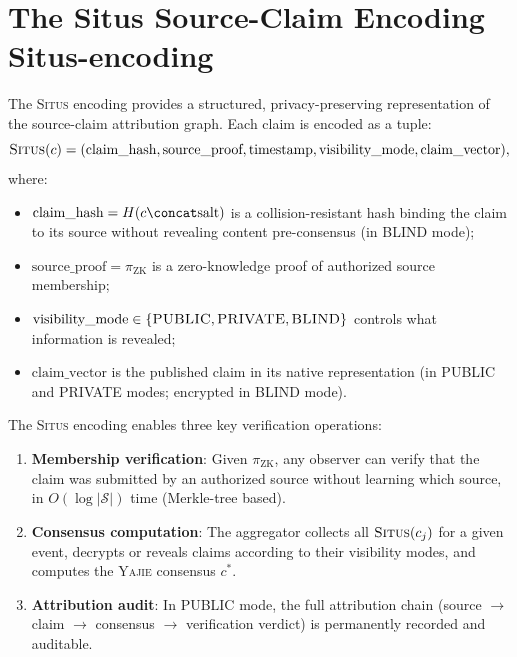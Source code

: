 \documentclass[11pt,a4paper]{article}
\theoremstyle{definition}
\newcommand{\Situs}{\textsc{Situs}}
\newcommand{\Yajie}{\textsc{Yajie}}
\newcommand{\sourceSet}{\mathcal{S}}
\newcommand{\VISpublic}{\textsc{PUBLIC}}
\newcommand{\VISprivate}{\textsc{PRIVATE}}
\newcommand{\VISblind}{\textsc{BLIND}}
\begin{document}
\section{The Situs Source-Claim Encoding Situs-encoding}
\label{sec:situs}

The \Situs{} encoding provides a structured, privacy-preserving representation of the source-claim attribution graph. Each claim is encoded as a tuple:
\begin{equation}
    \Situs(c) = (\text{claim\_hash}, \text{source\_proof}, \text{timestamp}, \text{visibility\_mode}, \text{claim\_vector}),
    \label{eq:situs_encoding}
\end{equation}
where:
\begin{itemize}
    \item $\text{claim\_hash} = H(c \concat \text{salt})$ is a collision-resistant hash binding the claim to its source without revealing content pre-consensus (in \VISblind{} mode);
    \item $\text{source\_proof} = \pi_{\mathrm{ZK}}$ is a zero-knowledge proof of authorized source membership;
    \item $\text{visibility\_mode} \in \{\VISpublic, \VISprivate, \VISblind\}$ controls what information is revealed;
    \item $\text{claim\_vector}$ is the published claim in its native representation (in \VISpublic{} and \VISprivate{} modes; encrypted in \VISblind{} mode).
\end{itemize}

The \Situs{} encoding enables three key verification operations:
\begin{enumerate}[label=(\roman*)]
    \item \textbf{Membership verification}: Given $\pi_{\mathrm{ZK}}$, any observer can verify that the claim was submitted by an authorized source without learning which source, in $O(\log |\sourceSet|)$ time (Merkle-tree based).
    \item \textbf{Consensus computation}: The aggregator collects all $\Situs(c_j)$ for a given event, decrypts or reveals claims according to their visibility modes, and computes the \Yajie{} consensus $c^*$.
    \item \textbf{Attribution audit}: In \VISpublic{} mode, the full attribution chain (source $\to$ claim $\to$ consensus $\to$ verification verdict) is permanently recorded and auditable.
\end{enumerate}
\end{document}

